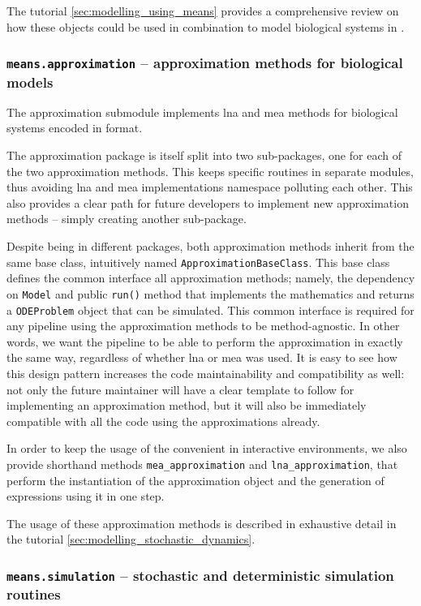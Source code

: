 The tutorial \autoref{sec:modelling_using_means} provides a comprehensive review on how these objects could be used in combination to model biological systems in \means{}.

\subsubsection{{\tt means.approximation} -- approximation methods for biological models}

The approximation submodule implements \gls{lna} and \gls{mea} methods for biological systems encoded in \means{} format.

The approximation package is itself split into two sub-packages, one for each of the two approximation methods.
This keeps specific routines in separate modules, thus avoiding \gls{lna} and \gls{mea} implementations namespace polluting each other.
This also provides a clear path for future developers to implement new approximation methods -- simply creating another sub-package.

Despite being in different packages, both approximation methods inherit from the same base class, intuitively named \verb"ApproximationBaseClass".
This base class defines the common interface all approximation methods; namely, the dependency on \verb"Model" and public \verb"run()" method that implements the mathematics and returns a \verb"ODEProblem" object that can be simulated.
This common interface is required for any pipeline using the approximation methods to be method-agnostic.
In other words, we want the pipeline to be able to perform the approximation in exactly the same way, regardless of whether \gls{lna} or \gls{mea} was used. 
It is easy to see how this design pattern increases the code maintainability and compatibility as well: not only the future maintainer will have a clear template to follow for implementing an approximation method, but it will also be immediately compatible with all the code using the approximations already.

In order to keep the usage of the \means{} convenient in interactive environments, we also provide shorthand methods \verb"mea_approximation" and \verb"lna_approximation", that perform the instantiation of the approximation object and the generation of expressions using it in one step.

The usage of these approximation methods is described in exhaustive detail in the tutorial \autoref{sec:modelling_stochastic_dynamics}.

\subsubsection{{\tt means.simulation} -- stochastic and deterministic simulation routines}
\label{sec:package_structure:simulation}

